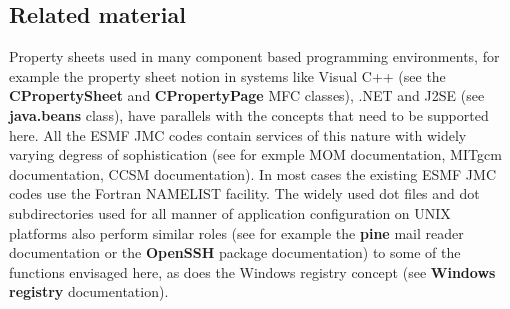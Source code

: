 \subsection{Related material}
 Property sheets used in many component based programming environments, for example
the property sheet notion in systems like Visual C++ (see the {\bf CPropertySheet} and
{\bf CPropertyPage} MFC classes), .NET and J2SE (see {\bf java.beans} class), have parallels with the concepts that need to 
be supported here. All the ESMF JMC codes contain services of this nature with widely 
varying degress of sophistication (see for exmple MOM documentation, MITgcm documentation, CCSM documentation). 
In most cases the existing ESMF JMC codes use the Fortran NAMELIST facility. The 
widely used dot files and dot subdirectories used for all manner of application configuration on UNIX 
platforms also perform similar roles (see for example the {\bf pine} mail reader
documentation or the {\bf OpenSSH} package documentation) to some of the functions envisaged here, as does the Windows 
registry concept (see {\bf Windows registry} documentation).


